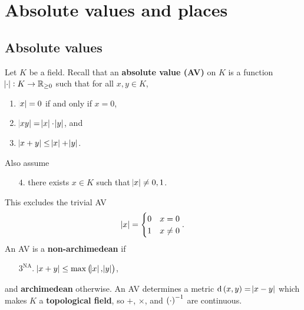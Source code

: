 \def\module{Algebraic Number Theory}
\def\lecturer{Professor Anthony Scholl}
\def\term{Lent 2020}
\def\cover{}
\def\syllabus{}
\def\thm{section}



\newcommand{\1}{\mathbbm{1}}
\newcommand{\dA}{\dif_\AA}
\newcommand{\dF}{\dif_F}
\newcommand{\dJ}{\dif_\JJJ}
\newcommand{\dJI}{\dif_{\JJJ^1}}
\newcommand{\dv}{\dif_v}
\newcommand{\hathat}[1]{\widehat{\widehat{#1\ }}\!\!}
\newcommand{\intA}[3][]{\int_{\ifstrempty{#1}{\AA_K}{#1}} #2 \, \dA #3}
\newcommand{\intF}[3][]{\int_{\ifstrempty{#1}{F}{#1}} #2 \, \dF #3}
\newcommand{\intFX}[3][]{\int_{\ifstrempty{#1}{F^\times}{#1}} #2 \, \dF^\times #3}
\newcommand{\intJ}[3][]{\int_{\ifstrempty{#1}{\JJJ_K}{#1}} #2 \, \dJ #3}
\newcommand{\intJI}[3][]{\int_{\ifstrempty{#1}{\JJJ_K^1}{#1}} #2 \, \dJI #3}
\newcommand{\intv}[3][]{\int_{\ifstrempty{#1}{K_v}{#1}} #2 \, \dv #3}
\newcommand{\intvX}[3][]{\int_{\ifstrempty{#1}{K_v^\times}{#1}} #2 \, \dv^\times #3}
\newcommand{\mods}{\mod\!\!^*\ }





\setcounter{section}{0}

\section{Absolute values and places}

\subsection{Absolute values}


Let $ K $ be a field. Recall that an \textbf{absolute value (AV)} on $ K $ is a function $ \abs{\cdot} : K \to \mathbb{R}_{\ge 0} $ such that for all $ x, y \in K $,
\begin{enumerate}
\item $ \abs{x} = 0 $ if and only if $ x = 0 $,
\item $ \abs{xy} = \abs{x} \cdot \abs{y} $, and
\item $ \abs{x + y} \le \abs{x} + \abs{y} $.
\end{enumerate}
Also assume
\begin{itemize}
\item[$ 4 $.] there exists $ x \in K $ such that $ \abs{x} \ne 0, 1 $.
\end{itemize}
This excludes the trivial AV
$$ \abs{x} =
\begin{cases}
0 & x = 0 \\
1 & x \ne 0
\end{cases}.
$$
An AV is a \textbf{non-archimedean} if
\begin{itemize}
\item[$ 3^{\text{NA}} $.] $ \abs{x + y} \le \max\br{\abs{x}, \abs{y}} $,
\end{itemize}
and \textbf{archimedean} otherwise. An AV determines a metric $ \d\br{x, y} = \abs{x - y} $ which makes $ K $ a \textbf{topological field}, so $ + $, $ \times $, and $ \br{\cdot}^{-1} $ are continuous.

